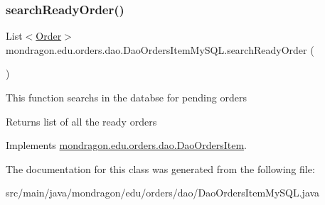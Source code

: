 \subsubsection{\texorpdfstring{searchReadyOrder()}{searchReadyOrder()}}
{\footnotesize\ttfamily List$<$\mbox{\hyperlink{classmondragon_1_1edu_1_1clases_1_1_order}{Order}}$>$ mondragon.\+edu.\+orders.\+dao.\+Dao\+Orders\+Item\+My\+S\+Q\+L.\+search\+Ready\+Order (\begin{DoxyParamCaption}{ }\end{DoxyParamCaption})\hspace{0.3cm}{\ttfamily [inline]}}

This function searchs in the databse for pending orders

\begin{DoxyReturn}{Returns}
list of all the ready orders 
\end{DoxyReturn}


Implements \mbox{\hyperlink{interfacemondragon_1_1edu_1_1orders_1_1dao_1_1_dao_orders_item}{mondragon.\+edu.\+orders.\+dao.\+Dao\+Orders\+Item}}.



The documentation for this class was generated from the following file\+:\begin{DoxyCompactItemize}
\item 
src/main/java/mondragon/edu/orders/dao/Dao\+Orders\+Item\+My\+S\+Q\+L.\+java\end{DoxyCompactItemize}
